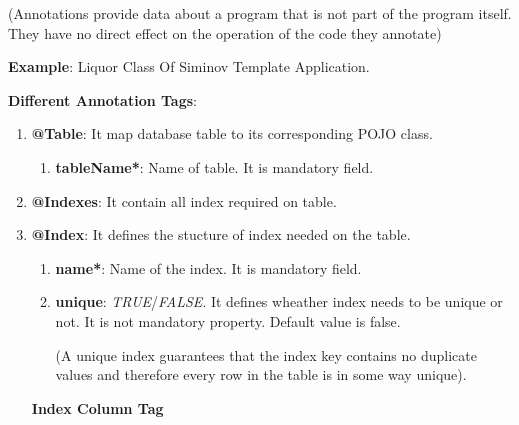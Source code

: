\par
(Annotations provide data about a program that is not part of the program itself. They have no direct effect on the operation of the code they annotate)



\textbf{Example}: Liquor Class Of Siminov Template Application.


\newpage
\textbf{Different Annotation Tags}:

\begin{enumerate}

	\item \small \textbf{@Table}: It map database table to its corresponding POJO class.
		
		\begin{enumerate}

			\item \small \textbf{tableName*}: Name of table. It is mandatory field.

		\end{enumerate}
	

	\item \small \textbf{@Indexes}: It contain all index required on table.


	\item \small \textbf{@Index}: It defines the stucture of  index needed on the table.

		\begin{enumerate}

			\item \small \textbf{name*}: Name of the index. It is mandatory field.
			\item \small \textbf{unique}: \textit{TRUE}/\textit{FALSE}. It defines wheather index needs to be unique or not. It is not mandatory property. Default value is false.
				
				\par
				(A unique index guarantees that the index key contains no duplicate values and therefore every row in the table is in some way unique). 


		\end{enumerate}

		
		\par
		\textbf{Index Column Tag}

		\begin{enumerate}


\end{enumerate}
\end{enumerate}
